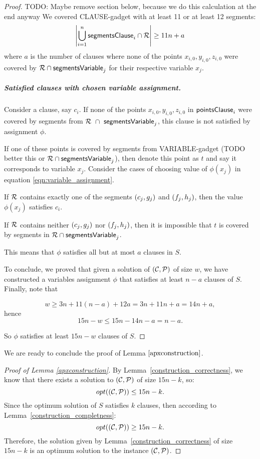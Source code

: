 \begin{proof}
TODO: Maybe remove section below, because we do this calculation at the end anyway
We covered CLAUSE-gadget with at least 11 or at least 12 segments:
$$\left|\bigcup\limits_{i=1}^n \mathsf{segmentsClause}_i \cap \mathcal{R}\right| \ge 11n + a$$
where $a$ is the number of clauses
where none of the points $x_{i,0}, y_{i,0}, z_{i,0}$
were covered by $\mathcal{R} \cap \mathsf{segmentsVariable}_{j}$ for their respective
variable $x_j$.

\subparagraph{Satisfied clauses with chosen variable assignment.}

Consider a clause, say $c_i$. If none of
the points $x_{i,0}, y_{i,0}, z_{i,0}$ in $\mathsf{pointsClause}_i$ were covered by
segments from $\mathcal{R}~\cap~\mathsf{segmentsVariable}_{j}$,
this clause is not satisfied by assignment $\phi$.

If one of these points is covered by 
segments from VARIABLE-gadget (TODO better this or $\mathcal{R} \cap \mathsf{segmentsVariable}_{j}$),
then denote this point as $t$ and say it corresponds to variable $x_j$.
Consider the cases of choosing value of $\phi(x_j)$
in equation \eqref{eqn:variable_assignment}.

If $\mathcal{R}$ contains exactly one of the segments $(c_{j}, g_{j})$ and $(f_{j}, h_{j})$,
then the value $\phi(x_j)$ satisfies $c_i$.

If $\mathcal{R}$ contains neither $(c_{j}, g_{j})$ nor $(f_{j}, h_{j})$,
then it is impossible that $t$ is covered by segments in $\mathcal{R} \cap \mathsf{segmentsVariable}_{j}$.

This means that $\phi$ satisfies all but at most $a$ clauses in $S$.


To conclude, we proved that given a solution of $(\mathcal{C}, \mathcal{P})$ of size $w$,
we have constructed a variables assignment $\phi$
that satisfies at least $n-a$ clauses of $S$.
Finally, note that

$$w \ge 3n + 11(n-a) + 12a = 3n + 11n + a = 14n + a,$$
hence
$$15n - w  \le 15n - 14n - a = n - a.$$

So $\phi$ satisfies at least $15n-w$ clauses of $S$.
\end{proof}

We are ready to conclude the proof of Lemma $\ref{apxconstruction}$.

\begin{proof}[Proof of Lemma \ref{apxconstruction}]
By Lemma~\ref{construction_correctness}, we know
that there exists a solution to $(\mathcal{C}, \mathcal{P})$ of size $15n-k$, so: 
$$opt((\mathcal{C}, \mathcal{P})) \le 15n - k.$$
Since the optimum solution of $S$ satisfies $k$ clauses,
then according to Lemma~\ref{construction_completness}:
$$opt((\mathcal{C}, \mathcal{P})) \ge 15n -k.$$
Therefore, the solution given by Lemma~\ref{construction_correctness} 
of size $15n - k$ is an optimum solution to the instance $(\mathcal{C}, \mathcal{P})$.
\end{proof}

